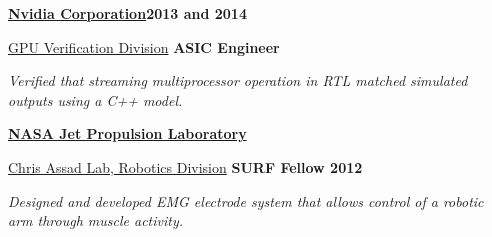\documentclass[10pt]{article}
\newenvironment{innerlist}[1][\enskip\textbullet]%
        {\begin{compactitem}[#1]}{\end{compactitem}}
\begin{document}
\textbf{\href{http://www.nvidia.com/}{Nvidia Corporation}}\hfill \textbf{2013 and 2014}
	\begin{innerlist}
		\item[] \href{http://www.geforce.com/hardware}{GPU Verification Division} \hfill \textbf{ASIC Engineer}
	\begin{innerlist}
	        \item[] \emph{Verified that streaming multiprocessor operation in RTL matched simulated outputs using a C++ model.}
	    \end{innerlist}
	\end{innerlist}

\textbf{\href{http://www.jpl.nasa.gov/}{NASA Jet Propulsion Laboratory}}
	\begin{innerlist}
		\item[] \href{https://www-robotics.jpl.nasa.gov/}{Chris Assad Lab, Robotics Division} \hfill \hfill \textbf{SURF Fellow 2012}
	    \begin{innerlist}
        \item[] \emph{Designed and developed EMG electrode system that allows control of a robotic arm through muscle activity.}
	    \end{innerlist}
	\end{innerlist}
\end{document}
